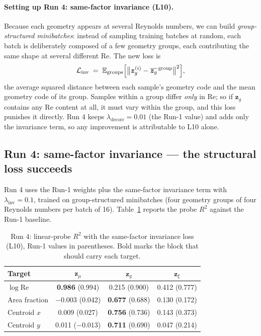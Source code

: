 \documentclass[11pt]{article}
\begin{document}
\paragraph{Setting up Run 4: same-factor invariance (L10).} Because each
geometry appears at several Reynolds numbers, we can build
\emph{group-structured minibatches}: instead of sampling training batches
at random, each batch is deliberately composed of a few geometry groups,
each contributing the same shape at several different Re. The new loss is
%
\begin{equation}
  \mathcal{L}_{\mathrm{inv}}
  \;=\;
  \mathbb{E}_{\text{groups}}
  \Bigl[ \bigl\| \boldsymbol{z}_{g}^{(i)} -
  \overline{\boldsymbol{z}_{g}}^{\,\text{group}} \bigr\|^2 \Bigr],
\end{equation}
%
the average squared distance between each sample's geometry code and the
mean geometry code of its group. Samples within a group differ
\emph{only} in Re; so if $\boldsymbol{z}_{g}$ contains any Re content at
all, it must vary within the group, and this loss punishes it directly.
Run 4 keeps $\lambda_{\mathrm{decorr}} = 0.01$ (the Run-1 value) and adds
only the invariance term, so any improvement is attributable to L10
alone.

\subsection{Run 4: same-factor invariance --- the structural loss succeeds}

Run 4 uses the Run-1 weights plus the same-factor invariance term with
$\lambda_{\mathrm{inv}} = 0.1$, trained on group-structured minibatches
(four geometry groups of four Reynolds numbers per batch of 16).
Table~\ref{tab:probes-run4} reports the probe $R^2$ against the Run-1
baseline.

\begin{table}[htbp]
  \centering
  \caption{Run 4: linear-probe $R^2$ with the same-factor invariance loss
  (L10), Run-1 values in parentheses. Bold marks the block that should
  carry each target.}
  \label{tab:probes-run4}
  \begin{tabular}{lccc}
    \toprule
    Target & $\boldsymbol{z}_{\mu}$ & $\boldsymbol{z}_{g}$ & $\boldsymbol{z}_{\xi}$ \\
    \midrule
    $\log \mathrm{Re}$ & \textbf{0.986} (0.994) & 0.215 (0.900) & 0.412 (0.777) \\
    Area fraction      & $-0.003$ (0.042)       & \textbf{0.677} (0.688) & 0.130 (0.172) \\
    Centroid $x$       & 0.009 (0.027)          & \textbf{0.756} (0.736) & 0.143 (0.373) \\
    Centroid $y$       & 0.011 ($-0.013$)       & \textbf{0.711} (0.690) & 0.047 (0.214) \\
    \bottomrule
  \end{tabular}
\end{table}
\end{document}
